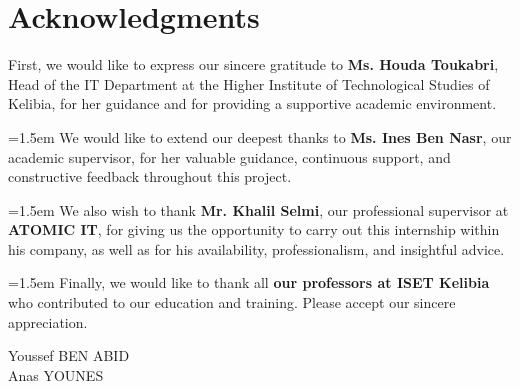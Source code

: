 \chapter*{Acknowledgments}
\begin{center}

First, we would like to express our sincere gratitude to \textbf{Ms. Houda Toukabri}, Head of the IT Department at the Higher Institute of Technological Studies of Kelibia, for her guidance and for providing a supportive academic environment. \\

\vspace{0.5cm}

\parindent=1.5em We would like to extend our deepest thanks to \textbf{Ms. Ines Ben Nasr}, our academic supervisor, for her valuable guidance, continuous support, and constructive feedback throughout this project. \\

\vspace{0.5cm}

\parindent=1.5em We also wish to thank \textbf{Mr. Khalil Selmi}, our professional supervisor at \textbf{ATOMIC IT}, for giving us the opportunity to carry out this internship within his company, as well as for his availability, professionalism, and insightful advice. \\

\vspace{0.5cm}

\parindent=1.5em Finally, we would like to thank all \textbf{our professors at ISET Kelibia} who contributed to our education and training. Please accept our sincere appreciation.

\end{center}

\begin{flushright}
    \LARGE Youssef BEN ABID \\
    \LARGE Anas YOUNES
\end{flushright}